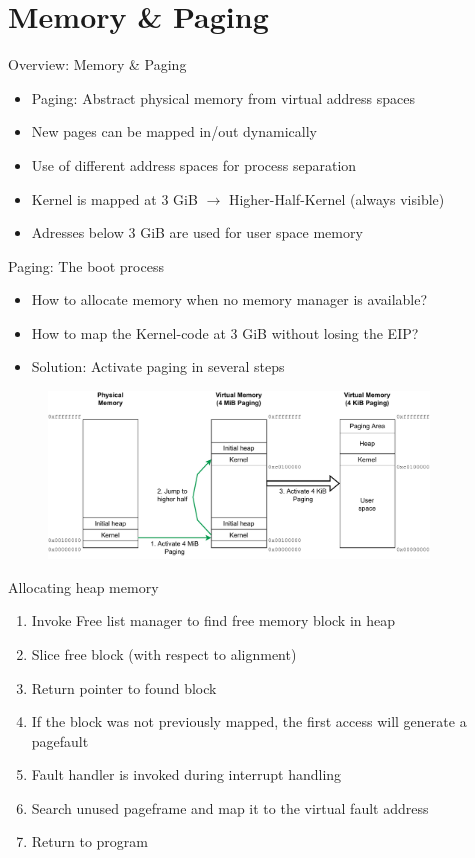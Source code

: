 \section{Memory \& Paging}

\begin{frame}{Overview: Memory \& Paging}
	\begin{itemize}
		\setlength\itemsep{1em}
		\item Paging: Abstract physical memory from virtual address spaces
		\item New pages can be mapped in/out dynamically
		\item Use of different address spaces for process separation
		\item Kernel is mapped at 3 GiB $\rightarrow$ Higher-Half-Kernel (always visible)
		\item Adresses below 3 GiB are used for user space memory
	\end{itemize}	
\end{frame}

\begin{frame}{Paging: The boot process}
	\begin{itemize}
		\item How to allocate memory when no memory manager is available?
		\item How to map the Kernel-code at 3 GiB without losing the EIP?
		\item Solution: Activate paging in several steps
	\end{itemize}
	\pause
	\begin{figure}
		\includegraphics[width=0.9\textwidth]{img/paging}
	\end{figure}
\end{frame}

\begin{frame}{Allocating heap memory}
	\begin{enumerate}
		\setlength\itemsep{1em}
		\item Invoke Free list manager to find free memory block in heap
		\item Slice free block (with respect to alignment)
		\item Return pointer to found block
		\item If the block was not previously mapped, the first access will generate a pagefault
		\item Fault handler is invoked during interrupt handling
		\item Search unused pageframe and map it to the virtual fault address
		\item Return to program
	\end{enumerate}
\end{frame}